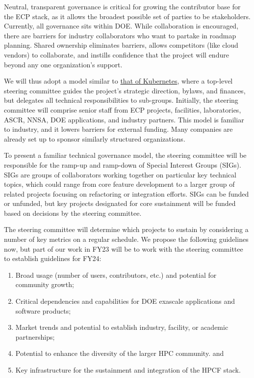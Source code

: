 \documentclass[11pt]{article}
\begin{document}
Neutral, transparent governance is critical for growing the contributor base for the ECP
stack, as it allows the broadest possible set of parties to be stakeholders. Currently,
all governance sits within DOE. While collaboration is encouraged, there are barriers
for industry collaborators who want to partake in roadmap planning. Shared ownership
eliminates barriers, allows competitors (like cloud vendors) to collaborate, and
instills confidence that the project will endure beyond any one organization's support.

We will thus adopt a model similar to
\href{https://github.com/kubernetes/steering/blob/main/charter.md}{that of Kubernetes},
where a top-level steering committee guides the project's strategic direction, bylaws,
and finances, but delegates all technical responsibilities to sub-groups. Initially, the
steering committee will comprise senior staff from ECP projects, facilities,
laboratories, ASCR, NNSA, DOE applications, and industry partners. This model is
familiar to industry, and it lowers barriers for external funding. Many companies are
already set up to sponsor similarly structured organizations.


To present a familiar technical governance model, the steering committee will be
responsible for the ramp-up and ramp-down of Special Interest Groups (SIGs). SIGs are
groups of collaborators working together on particular key technical topics, which could
range from core feature development to a larger group of related projects focusing on
refactoring or integration efforts. SIGs can be funded or unfunded, but key projects
designated for core sustainment will be funded based on decisions by the steering
committee.

The steering committee will determine which projects to sustain by considering a number
of key metrics on a regular schedule. We propose the following guidelines now, but part
of our work in FY23 will be to work with the steering committee to establish guidelines
for FY24:

\begin{enumerate}
\item Broad usage (number of users, contributors, etc.) and potential for community
  growth;
\item Critical dependencies and capabilities for DOE exascale applications and software
  products;
\item Market trends and potential to establish industry, facility, or academic
  partnerships;
\item Potential to enhance the diversity of the larger HPC community.
  and
\item Key infrastructure for the sustainment and integration of the HPCF stack.
\end{enumerate}
\end{document}
